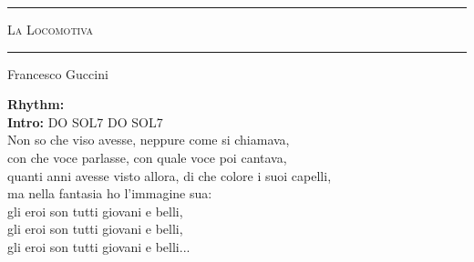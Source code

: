 \documentclass[10pt, twoside, a4paper]{article}
\begin{document}
\begin{center}

	\hrule \vspace{0.2cm}
     	\textsc{\LARGE La Locomotiva}
	\vspace{0.2cm} \hrule \vspace{0.2cm}
      	{\large Francesco Guccini}
      	
\end{center}



		
\textbf{Rhythm:} %
\\


\textbf{Intro:} DO SOL7 DO SOL7\\

Non so che viso avesse, neppure come si chiamava,  \\
con che voce parlasse, con quale voce poi cantava, \\
quanti anni avesse visto allora, di che colore i suoi capelli,\\
ma nella fantasia ho l'immagine sua:\\
gli eroi son tutti giovani e belli,\\
gli eroi son tutti giovani e belli,\\
gli eroi son tutti giovani e belli...\\
\end{document}
